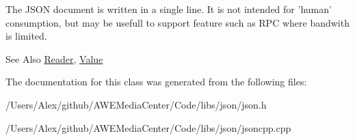 The J\-S\-O\-N document is written in a single line. It is not intended for 'human' consumption, but may be usefull to support feature such as R\-P\-C where bandwith is limited. \begin{DoxySeeAlso}{See Also}
\hyperlink{class_json_1_1_reader}{Reader}, \hyperlink{class_json_1_1_value}{Value} 
\end{DoxySeeAlso}


The documentation for this class was generated from the following files\-:\begin{DoxyCompactItemize}
\item 
/\-Users/\-Alex/github/\-A\-W\-E\-Media\-Center/\-Code/libs/json/json.\-h\item 
/\-Users/\-Alex/github/\-A\-W\-E\-Media\-Center/\-Code/libs/json/jsoncpp.\-cpp\end{DoxyCompactItemize}
